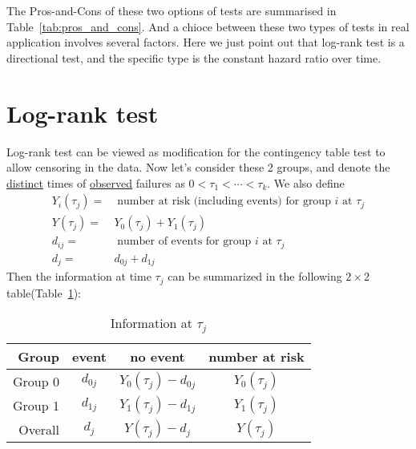 \documentclass[a4paper,12pt]{article}
\begin{document}
The Pros-and-Cons of these two options of tests are summarised in Table~\ref{tab:pros_and_cons}. And a chioce between these two types of tests in real application involves several factors. Here we just point out that log-rank test is a directional test, and the specific type is the {\color{red} constant hazard ratio over time}.

\section{Log-rank test}
\label{sec:log-rank-test}

Log-rank test can be viewed as modification for the contingency table test to allow censoring in the data. Now let's consider these 2 groups, and denote the \underline{distinct} times of \underline{observed} failures as $0 < \tau_1 < \cdots < \tau_k$. We also define
\[
  \begin{aligned}
    Y_i\left(\tau_j\right) =&\;\text{number at risk (including events) for group $i$ at $\tau_j$}     \\
    Y\left(\tau_j\right) =& Y_0\left(\tau_j\right) + Y_1\left(\tau_j\right)    \\
    d_{ij} =&\;\text{number of events for group $i$ at $\tau_j$}   \\
    d_j =& d_{0j} + d_{1j}
  \end{aligned}
\]
Then the information at time $\tau_j$ can be summarized in the following $2\times 2$ table(Table~\ref{tab:contingency_table_at_tau_j}):
\begin{table}[htbp]
  \centering
  \begin{tabular}{|r|c|c|c|}
    \hline
    Group & event & no event & number at risk    \\
    \hline
    Group 0 & $d_{0j}$ & $Y_0\left(\tau_j\right) - d_{0j}$ & $Y_0\left(\tau_j\right)$    \\
    \hline
    Group 1 & $d_{1j}$ & $Y_1\left(\tau_j\right) - d_{1j}$ & $Y_1\left(\tau_j\right)$    \\
    \hline
    Overall & $d_j$ & $Y\left(\tau_j\right) - d_{j}$ & $Y\left(\tau_j\right)$    \\
    \hline
  \end{tabular}
  \caption{Information at $\tau_j$}
  \label{tab:contingency_table_at_tau_j}
\end{table}
\end{document}

